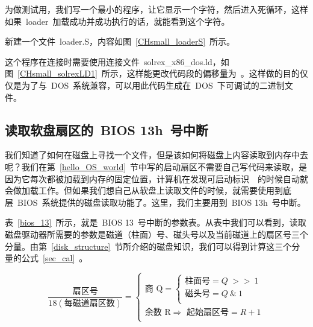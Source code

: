为做测试用，我们写一个最小的程序，让它显示一个字符，然后进入死循环，这样如果~loader~加载成功并成功执行的话，就能看到这个字符。

新建一个文件~loader.S，内容如图~\ref{CHsmall_loaderS}~所示。

\label{CHsmall_loaderS}

这个程序在连接时需要使用连接文件~solrex\_x86\_dos.ld，如图~\ref{CHsmall_solrexLD1}~所示，这样能更改代码段的偏移量为~。这样做的目的仅仅是为了与~DOS~系统兼容，可以用此代码生成在~DOS~下可调试的二进制文件。

\label{CHsmall_solrexLD1}

\subsection{读取软盘扇区的~BIOS 13h~号中断}

我们知道了如何在磁盘上寻找一个文件，但是该如何将磁盘上内容读取到内存中去呢？我们在第~\ref{hello_OS_world}~节中写的启动扇区不需要自己写代码来读取，是因为它每次都被加载到内存的固定位置，计算机在发现可启动标识~~的时候自动就会做加载工作。但如果我们想自己从软盘上读取文件的时候，就需要使用到底层~BIOS~系统提供的磁盘读取功能了。这里，我们主要用到~BIOS 13h~号中断。

表~\ref{bios_13}~所示，就是~BIOS 13~号中断的参数表。从表中我们可以看到，读取磁盘驱动器所需要的参数是磁道（柱面）号、磁头号以及当前磁道上的扇区号三个分量。由第~\ref{disk_structure}~节所介绍的磁盘知识，我们可以得到计算这三个分量的公式~\ref{sec_cal}~。

\begin{equation}\label{sec_cal}
\frac{\mbox{扇区号}}{18(\mbox{每磁道扇区数})} =
  \begin{cases}
    \mbox{商~Q} = \begin{cases}
	  \mbox{柱面号} = Q~>>~1\\
	  \mbox{磁头号} = Q~\&~1\\
	\end{cases}\\
	\mbox{余数~R} \Longrightarrow \mbox{~起始扇区号} = R + 1\\
  \end{cases}
\end{equation}

